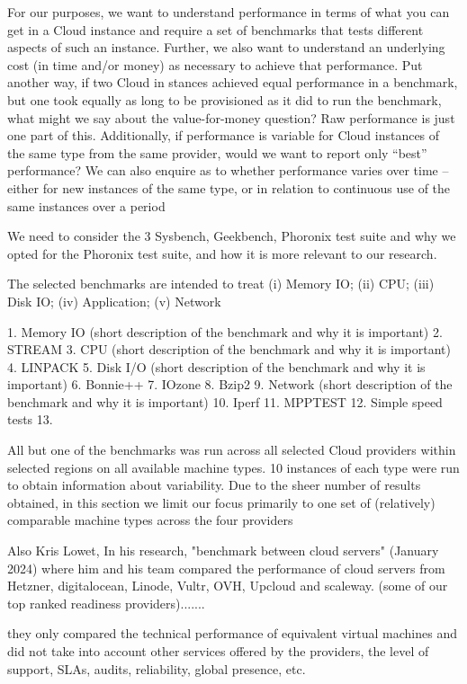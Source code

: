 For our purposes, we want to understand performance in terms of what you can get in a Cloud instance and require a set of benchmarks that tests different aspects of such an instance. Further, we also want to understand an underlying cost (in time and/or money) as necessary to achieve that performance. Put another way, if two Cloud in
stances achieved equal performance in a benchmark, but one took equally as long to be provisioned as it did to run the benchmark, what might we say about the value-for-money question? Raw performance is just one part of this. Additionally, if performance is variable for Cloud instances of the same type from the same provider, would we want to report only “best” performance? We can also enquire as to whether performance varies over time – either for new instances of the same type, or in relation to continuous use of the same instances over a period

We need to consider the 3 Sysbench, Geekbench, Phoronix test suite and why we opted for the Phoronix test suite, and how it is more relevant to our research.




The selected benchmarks are intended to treat (i) Memory IO; (ii) CPU; (iii) Disk IO; (iv) Application; (v) Network

1. Memory IO (short description of the benchmark and why it is important)
2. STREAM
3. CPU (short description of the benchmark and why it is important)
4. LINPACK
5. Disk I/O (short description of the benchmark and why it is important)
6. Bonnie++
7. IOzone
8. Bzip2
9. Network (short description of the benchmark and why it is important)
10. Iperf
11. MPPTEST
12. Simple speed tests 
13. 

All but one of the benchmarks was run across all selected Cloud providers within selected regions on all available machine types. 10 instances of each type were run to obtain information about variability. Due to the sheer number of results obtained, in this section we limit our focus primarily to one set of (relatively) comparable machine types across the four providers

Also Kris Lowet, In his research, "benchmark between cloud servers" (January 2024) where him and his team compared the performance of cloud servers from Hetzner, digitalocean, Linode, Vultr, OVH, Upcloud and scaleway. (some of our top ranked readiness providers).......

they only compared the technical performance of equivalent virtual machines and did not take into account other services offered by the providers, the level of support, SLAs, audits, reliability, global presence, etc.

